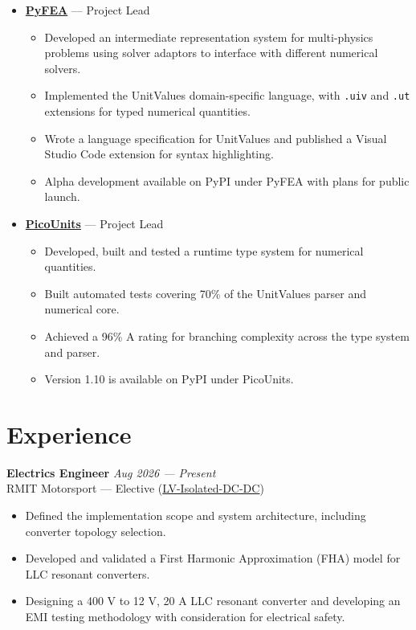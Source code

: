 \documentclass[11pt,a4paper]{article}
\begin{document}
\begin{itemize}[leftmargin=*, noitemsep, topsep=2pt]
\item[] \textbf{\href{https://github.com/Bowley-Systems/PyFEA}{PyFEA}} --- Project Lead
    \begin{itemize}[leftmargin=*, noitemsep, topsep=2pt]
        \item Developed an intermediate representation system for multi-physics problems using solver adaptors to interface with different numerical solvers.
        \item Implemented the UnitValues domain-specific language, with \texttt{.uiv} and \texttt{.ut} extensions for typed numerical quantities.
        \item Wrote a language specification for UnitValues and published a Visual Studio Code extension for syntax highlighting.
        \item Alpha development available on PyPI under PyFEA with plans for public launch.
    \end{itemize}

\item[] \textbf{\href{https://github.com/wgbowley/PicoUnits}{PicoUnits}} --- Project Lead
    \begin{itemize}[leftmargin=*, noitemsep, topsep=2pt]
        \item Developed, built and tested a runtime type system for numerical quantities.
        \item Built automated tests covering 70\% of the UnitValues parser and numerical core.
        \item Achieved a 96\% A rating for branching complexity across the type system and parser.
        \item Version 1.10 is available on PyPI under PicoUnits.
    \end{itemize}
\end{itemize}

\newpage

\section*{Experience}

\noindent\textbf{Electrics Engineer} \hfill \textit{Aug 2026 --- Present} \\
RMIT Motorsport --- Elective (\href{https://github.com/rmit-wgbowley/LV-Isolated-DC-DC}{LV-Isolated-DC-DC})
\begin{itemize}[leftmargin=*, noitemsep, topsep=2pt]
\item Defined the implementation scope and system architecture, including converter topology selection.
\item Developed and validated a First Harmonic Approximation (FHA) model for LLC resonant converters.
\item Designing a 400 V to 12 V, 20 A LLC resonant converter and developing an EMI testing methodology with consideration for electrical safety.
\end{itemize}
\end{document}
